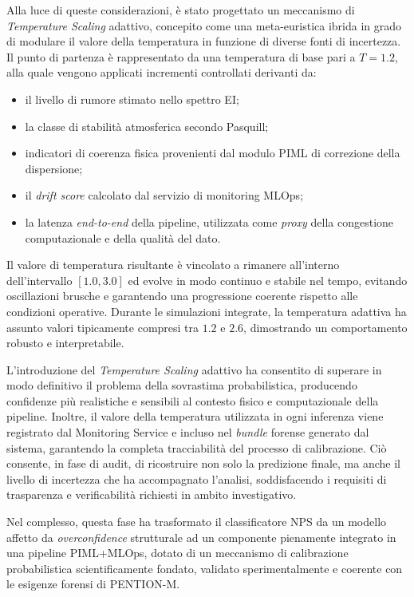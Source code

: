 Alla luce di queste considerazioni, è stato progettato un meccanismo di \emph{Temperature Scaling} adattivo, concepito come una meta-euristica ibrida in grado di modulare il valore della temperatura in funzione di diverse fonti di incertezza. Il punto di partenza è rappresentato da una temperatura di base pari a $T=1.2$, alla quale vengono applicati incrementi controllati derivanti da:
\begin{itemize}
    \item il livello di rumore stimato nello spettro EI;
    \item la classe di stabilità atmosferica secondo Pasquill;
    \item indicatori di coerenza fisica provenienti dal modulo PIML di correzione della dispersione;
    \item il \textit{drift score} calcolato dal servizio di monitoring MLOps;
    \item la latenza \textit{end-to-end} della pipeline, utilizzata come \textit{proxy} della congestione computazionale e della qualità del dato.
\end{itemize}

Il valore di temperatura risultante è vincolato a rimanere all’interno dell’intervallo $[1.0, 3.0]$ ed evolve in modo continuo e stabile nel tempo, evitando oscillazioni brusche e garantendo una progressione coerente rispetto alle condizioni operative. Durante le simulazioni integrate, la temperatura adattiva ha assunto valori tipicamente compresi tra $1.2$ e $2.6$, dimostrando un comportamento robusto e interpretabile.

L’introduzione del \textit{Temperature Scaling} adattivo ha consentito di superare in modo definitivo il problema della sovrastima probabilistica, producendo confidenze più realistiche e sensibili al contesto fisico e computazionale della pipeline. Inoltre, il valore della temperatura utilizzata in ogni inferenza viene registrato dal Monitoring Service e incluso nel \textit{bundle} forense generato dal sistema, garantendo la completa tracciabilità del processo di calibrazione. Ciò consente, in fase di audit, di ricostruire non solo la predizione finale, ma anche il livello di incertezza che ha accompagnato l’analisi, soddisfacendo i requisiti di trasparenza e verificabilità richiesti in ambito investigativo.

Nel complesso, questa fase ha trasformato il classificatore NPS da un modello affetto da \textit{overconfidence} strutturale ad un componente pienamente integrato in una pipeline PIML+MLOps, dotato di un meccanismo di calibrazione probabilistica scientificamente fondato, validato sperimentalmente e coerente con le esigenze forensi di \textsc{PENTION-M}.

